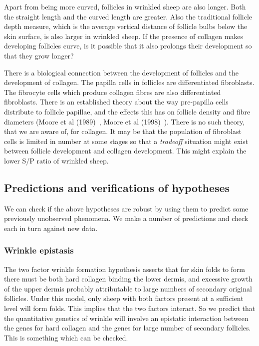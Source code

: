\documentclass[titlepage]{article}  %
\begin{document}
Apart from being more curved, follicles in wrinkled sheep are also longer. Both the straight length and the curved length are greater. Also the traditional follicle depth measure, which is the average vertical distance of follicle bulbs below the skin surface, is also larger in wrinkled sheep.  If the presence of collagen makes developing follicles curve, is it possible that it also prolongs their development so that they grow longer? 

There is a biological connection between the development of follicles and the development of collagen. The papilla cells in follicles are differentiated fibroblasts. The fibrocyte cells which produce collagen fibres are also differentiated fibroblasts.  There is an established theory about the way pre-papilla cells distribute to follicle papillae, and the effects this has on follicle density and fibre diameters (Moore et al (1989)~\cite{moor:89}, Moore et al (1998)~\cite{moor:98}). There is no such theory, that we are aware of, for collagen. It may be that the population of fibroblast cells is limited in number at some stages so that a {\em tradeoff} situation might exist between follicle development and collagen development. This might explain the lower S/P ratio of wrinkled sheep.

\subsection{Predictions and verifications of hypotheses}
We can check if the above hypotheses are robust by using them to predict some previously unobserved phenomena. We make a number of predictions and check each in turn against new data.

\subsubsection{Wrinkle epistasis}
The two factor wrinkle formation hypothesis asserts that for skin folds to form there must be both hard collagen binding the lower dermis, and excessive growth of the upper dermis probably attributable to large numbers of secondary original follicles. Under this model, only sheep with both factors present at a sufficient level will form folds. This implies that the two factors interact. So we predict that the quantitative genetics of wrinkle will involve an epistatic interaction between the genes for hard collagen and the genes for large number of secondary follicles. This is something which can be checked.
\end{document}
